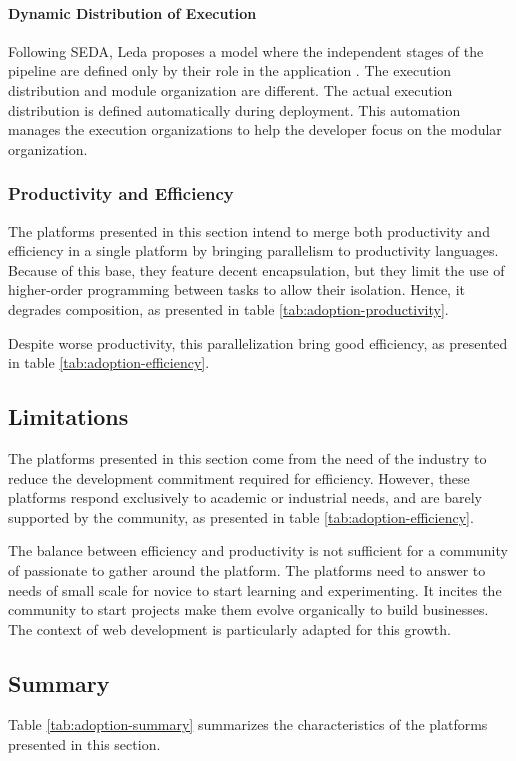 \paragraph{Dynamic Distribution of Execution}

Following SEDA, Leda proposes a model where the independent stages of the pipeline are defined only by their role in the application \cite{Salmito2013,Salmito2014}.
The execution distribution and module organization are different.
The actual execution distribution is defined automatically during deployment.
This automation manages the execution organizations to help the developer focus on the modular organization.

\subsubsection{Productivity and Efficiency}

The platforms presented in this section intend to merge both productivity and efficiency in a single platform by bringing parallelism to productivity languages.
Because of this base, they feature decent encapsulation, but they limit the use of higher-order programming between tasks to allow their isolation.
Hence, it degrades composition, as presented in table \ref{tab:adoption-productivity}.

Despite worse productivity, this parallelization bring good efficiency, as presented in table \ref{tab:adoption-efficiency}.


\subsection{Limitations}

The platforms presented in this section come from the need of the industry to reduce the development commitment required for efficiency.
However, these platforms respond exclusively to academic or industrial needs, and are barely supported by the community, as presented in table \ref{tab:adoption-efficiency}.

The balance between efficiency and productivity is not sufficient for a community of passionate to gather around the platform.
The platforms need to answer to needs of small scale for novice to start learning and experimenting.
It incites the community to start projects make them evolve organically to build businesses.
The context of web development is particularly adapted for this growth.


\subsection{Summary}

Table \ref{tab:adoption-summary} summarizes the characteristics of the platforms presented in this section.












\endinput